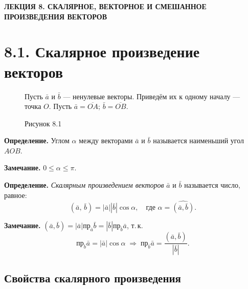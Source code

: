 \documentclass[12pt,a4paper]{article}
\newcommand{\va}{\bar{a}}
\newcommand{\vb}{\bar{b}}
\newcommand{\pr}{\text{пр}}
\begin{document}
\begin{center}
  {\large\bfseries ЛЕКЦИЯ 8. СКАЛЯРНОЕ, ВЕКТОРНОЕ И СМЕШАННОЕ\\
  ПРОИЗВЕДЕНИЯ ВЕКТОРОВ}
\end{center}

\section*{8.1. Скалярное произведение векторов}

\begin{figure}[h]
  \centering
  \begin{minipage}{0.4\textwidth}
    \centering
  \end{minipage}%
  \begin{minipage}{0.55\textwidth}
    Пусть $\va$ и $\vb$ --- ненулевые векторы.
    Приведём их к одному началу ---
    точка $O$. Пусть $\va = \overline{OA}$; $\vb = \overline{OB}$.
  \end{minipage}
  \caption*{Рисунок 8.1}
\end{figure}

\textbf{Определение.} Углом $\alpha$ между векторами $\va$ и $\vb$
называется наименьший угол $AOB$.

\textbf{Замечание.} $0 \leq \alpha \leq \pi$.

\medskip

\textbf{Определение.} \textit{Скалярным произведением векторов} $\va$
и $\vb$ называется число, равное:
$$
(\va,\, \vb) = |\va||\vb|\cos\alpha, \quad \text{где } \alpha =
\widehat{(\va,\vb)}.
$$

\textbf{Замечание.} $(\va, \vb) = |\va|\pr_{\va}\vb = |\vb|\pr_{\vb}\va$, т.\,к.
$$
\pr_{\vb}\va = |\va|\cos\alpha \;\Rightarrow\; \pr_{\vb}\va =
\frac{(\va,\vb)}{|\vb|}.
$$

\subsection*{Свойства скалярного произведения}
\end{document}

